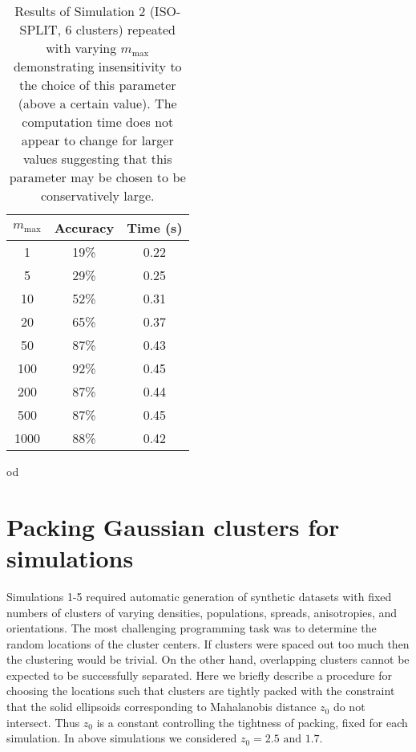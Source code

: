\documentclass[10pt]{article}
\begin{document}
\begin{table}[t]
  \centering
\begin{tabular}{c|c|c|}
	\textbf{$m_\text{max}$} & \textbf{Accuracy} & \textbf{Time (s)} \\
	\hline
1 & 19\% & 0.22 \\
5 & 29\% & 0.25 \\
10 & 52\% & 0.31 \\
20 & 65\% & 0.37 \\
50 & 87\% & 0.43 \\
100 & 92\% & 0.45 \\
200 & 87\% & 0.44 \\
500 & 87\% & 0.45 \\
1000 & 88\% & 0.42 \\
\end{tabular}
\caption{
\label{table:m_max_dependence}
Results of Simulation 2 (ISO-SPLIT, 6 clusters) repeated with varying $m_\text{max}$ demonstrating insensitivity to the choice of this parameter (above a certain value). The computation time does not appear to change for larger values suggesting that this parameter may be chosen to be conservatively large.
}od
\end{table}


\section {Packing Gaussian clusters for simulations}
\label{appendixPacking}

Simulations 1-5 required automatic generation of synthetic datasets with fixed numbers of clusters of varying densities, populations, spreads, anisotropies, and orientations. The most challenging programming task was to determine the random locations of the cluster centers. If clusters were spaced out too much then the clustering would be trivial. On the other hand, overlapping clusters cannot be expected to be successfully separated. Here we briefly describe a procedure for choosing the locations such that clusters are tightly packed with the constraint that the solid ellipsoids corresponding to Mahalanobis distance $z_0$ do not intersect. Thus $z_0$ is a constant controlling the tightness of packing, fixed for each simulation. In above simulations we considered $z_0=2.5\text{ and }1.7$.
\end{document}

